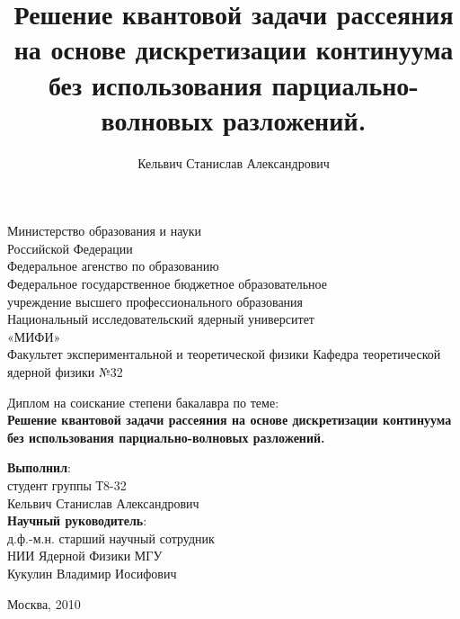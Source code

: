 \documentclass[a4paper,12pt]{article}
\title{Решение квантовой задачи рассеяния на основе дискретизации континуума без использования парциально-волновых разложений.}
\author{Кельвич Станислав Александрович}
\begin{document}
	
	
  \begin{titlepage}
  
  \begin{center}
	Министерство образования и науки \\
	Российской Федерации \\ 
	Федеральное агенство по образованию \\ 
	Федеральное государственное бюджетное образовательное \\
	учреждение высшего профессионального образования \\
	Национальный исследовательский ядерный университет \\
	«МИФИ» \\
	Факультет экспериментальной и теоретической физики
	Кафедра теоретической ядерной физики №32
	\end{center}
	
	\vspace{1cm}
	
	\begin{center}\Large
	Диплом на соискание степени бакалавра по теме: \\
	\bf{Решение квантовой задачи рассеяния на основе дискретизации континуума без использования парциально-волновых разложений.}
  \end{center}
  
  \vspace{1cm}
	
	\begin{flushright}
	\textbf{Выполнил}: \\
	студент группы Т8-32 \\
	Кельвич Станислав Александрович \\
	\vspace{1cm}
	\textbf{Научный руководитель}: \\
	д.ф.-м.н. старший научный сотрудник \\
	НИИ Ядерной Физики МГУ \\
	Кукулин Владимир Иосифович \\
	\end{flushright}
	
	\vspace{1.5cm}
	\begin{center}
	  Москва, 2010
	\end{center}
	
  \end{titlepage}
	\pagebreak
	
\end{document}
